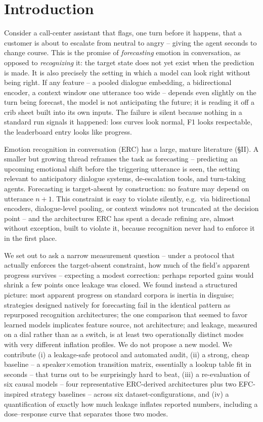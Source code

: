 \documentclass[conference]{IEEEtran}
\begin{document}
\section{Introduction}

Consider a call-center assistant that flags, one turn before it happens, that a customer is about
to escalate from neutral to angry -- giving the agent seconds to change course. This is the promise
of \emph{forecasting} emotion in conversation, as opposed to \emph{recognizing} it: the target
state does not yet exist when the prediction is made. It is also precisely the setting in which a
model can look right without being right. If any feature -- a pooled dialogue embedding, a
bidirectional encoder, a context window one utterance too wide -- depends even slightly on the turn
being forecast, the model is not anticipating the future; it is reading it off a crib sheet built
into its own inputs. The failure is silent because nothing in a standard run signals it happened:
loss curves look normal, F1 looks respectable, the leaderboard entry looks like progress.

Emotion recognition in conversation (ERC) has a large, mature literature (\S II). A smaller but
growing thread reframes the task as forecasting -- predicting an upcoming emotional shift before
the triggering utterance is seen, the setting relevant to anticipatory dialogue systems,
de-escalation tools, and turn-taking agents. Forecasting is target-absent by construction: no
feature may depend on utterance $n{+}1$. This constraint is easy to violate silently, e.g.\ via
bidirectional encoders, dialogue-level pooling, or context windows not truncated at the decision
point -- and the architectures ERC has spent a decade refining are, almost without exception, built
to violate it, because recognition never had to enforce it in the first place.

We set out to ask a narrow measurement question -- under a protocol that actually enforces the
target-absent constraint, how much of the field's apparent progress survives -- expecting a modest
correction: perhaps reported gains would shrink a few points once leakage was closed. We found
instead a structured picture: most apparent progress on standard corpora is inertia in disguise;
strategies designed natively for forecasting fail in the identical pattern as repurposed
recognition architectures; the one comparison that seemed to favor learned models implicates
feature source, not architecture; and leakage, measured on a dial rather than as a switch, is at
least two operationally distinct modes with very different inflation profiles. We do
not propose a new model. We contribute (i) a leakage-safe protocol and automated audit, (ii) a
strong, cheap baseline -- a speaker$\times$emotion transition matrix, essentially a lookup table
fit in seconds -- that turns out to be surprisingly hard to beat, (iii) a re-evaluation of six
causal models -- four representative ERC-derived architectures plus two EFC-inspired strategy
baselines -- across six dataset-configurations, and (iv) a quantification of exactly how much
leakage inflates reported numbers, including a dose--response curve that separates those two modes.
\end{document}
